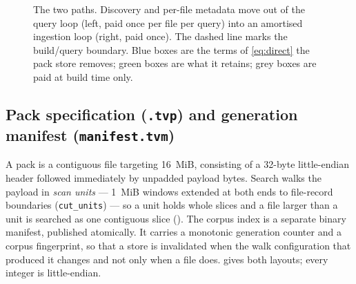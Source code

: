 \documentclass[11pt,letterpaper]{article}
\begin{document}
\begin{figure}[t]
{%
}
\caption{The two paths. Discovery and per-file metadata move out of the query
loop (left, paid once per file per query) into an amortised ingestion loop
(right, paid once). The dashed line marks the build/query boundary. Blue boxes
are the terms of \eqref{eq:direct} the pack store removes; green boxes are
what it retains; grey boxes are paid at build time only.}
\label{fig:arch}
\end{figure}

\subsection{Pack specification (\texttt{.tvp}) and generation manifest
(\texttt{manifest.tvm})}
A pack is a contiguous file targeting 16~MiB, consisting of a 32-byte
little-endian header followed immediately by unpadded payload bytes. Search
walks the payload in \emph{scan units} --- 1~MiB windows extended at both
ends to file-record boundaries (\texttt{cut\_units}) --- so a unit holds
whole slices and a file larger than a unit is searched as one contiguous
slice (). The
corpus index is a separate binary manifest, published atomically. It carries
a monotonic generation counter and a corpus fingerprint, so that a store is
invalidated when the walk configuration that produced it changes and not
only when a file does.  gives both layouts; every integer
is little-endian.
\end{document}
